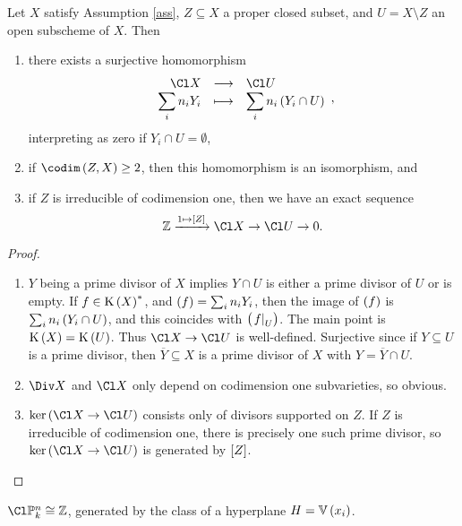 \pagebreak


\begin{proposition}
Let $ X $ satisfy Assumption \ref{ass}, $ Z \subseteq X $ a proper closed subset, and $ U = X \setminus Z $ an open subscheme of $ X $. Then
\begin{enumerate}
\item there exists a surjective homomorphism
$$ \function{\Cl X}{\Cl U}{\sum_i n_iY_i}{\sum_i n_i\br{Y_i \cap U}}, $$
interpreting as zero if $ Y_i \cap U = \emptyset $,
\item if $ \codim\br{Z, X} \ge 2 $, then this homomorphism is an isomorphism, and
\item if $ Z $ is irreducible of codimension one, then we have an exact sequence
$$ \ZZ \xrightarrow{1 \mapsto \sbr{Z}} \Cl X \to \Cl U \to 0. $$
\end{enumerate}
\end{proposition}

\begin{proof}
\hfill
\begin{enumerate}
\item $ Y $ being a prime divisor of $ X $ implies $ Y \cap U $ is either a prime divisor of $ U $ or is empty. If $ f \in \K\br{X}^* $, and $ \br{f} = \sum_i n_iY_i $, then the image of $ \br{f} $ is $ \sum_i n_i\br{Y_i \cap U} $, and this coincides with $ \br{\eval{f}_U} $. The main point is $ \K\br{X} = \K\br{U} $. Thus $ \Cl X \to \Cl U $ is well-defined. Surjective since if $ Y \subseteq U $ is a prime divisor, then $ \overline{Y} \subseteq X $ is a prime divisor of $ X $ with $ Y = \overline{Y} \cap U $.
\item $ \Div X $ and $ \Cl X $ only depend on codimension one subvarieties, so obvious.
\item $ \ker \br{\Cl X \to \Cl U} $ consists only of divisors supported on $ Z $. If $ Z $ is irreducible of codimension one, there is precisely one such prime divisor, so $ \ker \br{\Cl X \to \Cl U} $ is generated by $ \sbr{Z} $.
\end{enumerate}
\end{proof}

\begin{proposition}
$ \Cl \PP_k^n \cong \ZZ $, generated by the class of a hyperplane $ H = \VV\br{x_i} $.
\end{proposition}

